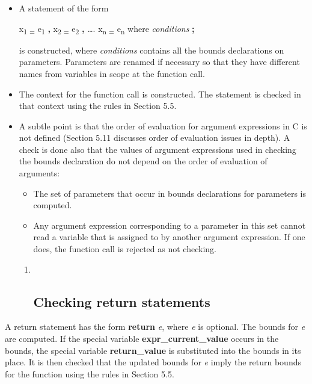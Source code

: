 \documentclass[]{article}
\begin{document}
\begin{itemize}
\item
  A statement of the form

  x\textsubscript{1 =} e\textsubscript{1} \textbf{,} x\textsubscript{2
  =} e\textsubscript{2} \textbf{,} \ldots{}. x\textsubscript{n =}
  e\textsubscript{n} where \emph{conditions} \textbf{;}

  is constructed, where \emph{conditions} contains all the bounds
  declarations on parameters. Parameters are renamed if necessary so
  that they have different names from variables in scope at the function
  call.
\item
  The context for the function call is constructed. The statement is
  checked in that context using the rules in Section 5.5.
\item
  A subtle point is that the order of evaluation for argument
  expressions in C is not defined (Section 5.11 discusses order of
  evaluation issues in depth). A check is done also that the values of
  argument expressions used in checking the bounds declaration do not
  depend on the order of evaluation of arguments:

  \begin{itemize}
  \item
    The set of parameters that occur in bounds declarations for
    parameters is computed.
  \item
    Any argument expression corresponding to a parameter in this set
    cannot read a variable that is assigned to by another argument
    expression. If one does, the function call is rejected as not
    checking.
  \end{itemize}

  \begin{enumerate}
  \def\labelenumi{\arabic{enumi}.}
  \item ~
    \subsection{\texorpdfstring{\protect\hypertarget{ux5fToc426641089}{}{\protect\hypertarget{ux5fToc435434964}{}{\protect\hypertarget{ux5fToc437460792}{}{\protect\hypertarget{ux5fToc440445473}{}{\protect\hypertarget{ux5fToc440449255}{}{\protect\hypertarget{ux5fToc440551905}{}{}}}}}}Checking
    return
    statements}{Checking return statements}}\label{checking-return-statements}
  \end{enumerate}
\end{itemize}

A return statement has the form \textbf{return} \emph{e}, where \emph{e}
is optional. The bounds for \emph{e} are computed. If the special
variable \textbf{expr\_current\_value} occurs in the bounds, the special
variable \textbf{return\_value} is substituted into the bounds in its
place. It is then checked that the updated bounds for \emph{e} imply the
return bounds for the function using the rules in Section 5.5.
\end{document}
